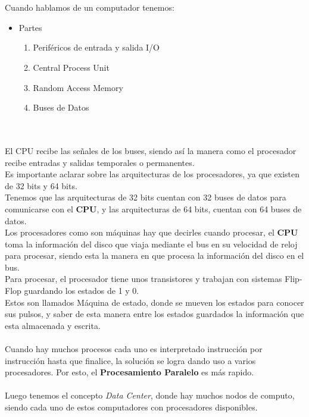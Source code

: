 \documentclass[a4paper]{report} %
\begin{document}
            \\\\Cuando hablamos de un computador tenemos:
             \begin{itemize}
               \item Partes
              \begin{enumerate}
                \item Periféricos de entrada y salida I/O
                \item Central Process Unit
                \item Random Access Memory
                \item Buses de Datos
              \end{enumerate}
             \end{itemize}\mbox{}\\
            \\El CPU recibe las señales de los buses, siendo así la manera como el procesador recibe entradas y salidas temporales o permanentes.
            \\Es importante aclarar sobre las arquitecturas de los procesadores, ya que existen de 32 bits y 64 bits.\\Tenemos que las arquitecturas de 32 bits cuentan con 32 buses de datos para comunicarse con el \textbf{CPU}, y las arquitecturas de 64 bits, cuentan con 64 buses de datos.
            \\Los procesadores como son máquinas hay que decirles cuando procesar, el \textbf{CPU} toma la información del disco que viaja mediante el bus en su velocidad de reloj para procesar, siendo esta la manera en que procesa la información del disco en el bus.
          \\Para procesar, el procesador tiene unos transistores y trabajan con sistemas Flip-Flop guardando los estados de 1 y 0.\\Estos son llamados Máquina de estado, donde se mueven los estados para conocer sus pulsos, y saber de esta manera entre los estados guardados la información que esta almacenada y escrita.
           \\\\Cuando hay muchos procesos cada uno es interpretado instrucción por instrucción hasta que finalice, la solución se logra dando uso a varios procesadores. Por esto, el \textbf{Procesamiento Paralelo} es más rapido.
           \\\\Luego tenemos el concepto \textit{Data Center}, donde hay muchos nodos de computo, siendo cada uno de estos computadores con procesadores disponibles.
\end{document}
